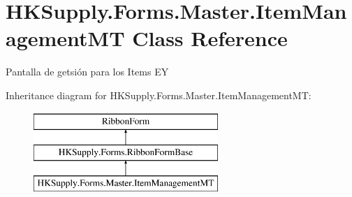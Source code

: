 \hypertarget{class_h_k_supply_1_1_forms_1_1_master_1_1_item_management_m_t}{}\section{H\+K\+Supply.\+Forms.\+Master.\+Item\+Management\+MT Class Reference}
\label{class_h_k_supply_1_1_forms_1_1_master_1_1_item_management_m_t}


Pantalla de getsión para los Items EY  


Inheritance diagram for H\+K\+Supply.\+Forms.\+Master.\+Item\+Management\+MT\+:\begin{figure}[H]
\begin{center}
\leavevmode
\includegraphics[height=3.000000cm]{class_h_k_supply_1_1_forms_1_1_master_1_1_item_management_m_t}
\end{center}
\end{figure}
